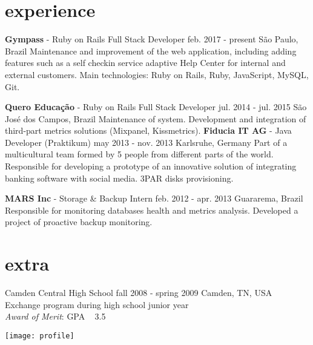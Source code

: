 \documentclass[]{friggeri-cv}
\begin{document}
\section{experience}

\begin{entrylist}
  \entry
  {\textbf{Gympass} - Ruby on Rails Full Stack Developer}
  {feb. 2017 - present}
  {São Paulo, Brazil}
  { Maintenance and improvement of the web application, including adding features such as a self checkin service adaptive Help Center for internal and external customers. Main technologies: Ruby on Rails, Ruby, JavaScript, MySQL, Git.}
  
  \entry
    {\textbf{Quero Educação} - Ruby on Rails Full Stack Developer}
    {jul. 2014 - jul. 2015}
    {São José dos Campos, Brazil}
  { Maintenance of system. Development and integration of third-part metrics solutions (Mixpanel, Kissmetrics).}
  \entry
  	{\textbf{Fiducia IT AG} - Java Developer (Praktikum)}
    {may 2013 - nov. 2013}
    {Karlsruhe, Germany}
    {Part of a multicultural team formed by 5 people from different parts of the world. Responsible for developing a prototype of an innovative solution of integrating banking software with social media. 3PAR disks provisioning.}

  \entry
    {\textbf{MARS Inc} - Storage \& Backup Intern}
    {feb. 2012 - apr. 2013}
    {Guararema, Brazil}
    {Responsible for monitoring databases health and metrics analysis. Developed a project of proactive backup monitoring.}

\end{entrylist}

\section{extra}

\begin{entrylist}
  \entry
    {Camden Central High School}
    {fall 2008 - spring 2009}
    {Camden, TN, USA}
    {Exchange program during high school junior year\\
    \textit{Award of Merit}: GPA \geq ~ 3.5}\\


\end{entrylist}

\begin{rside}
 \texttt{[image: profile]}
\end{rside}
\end{document}
